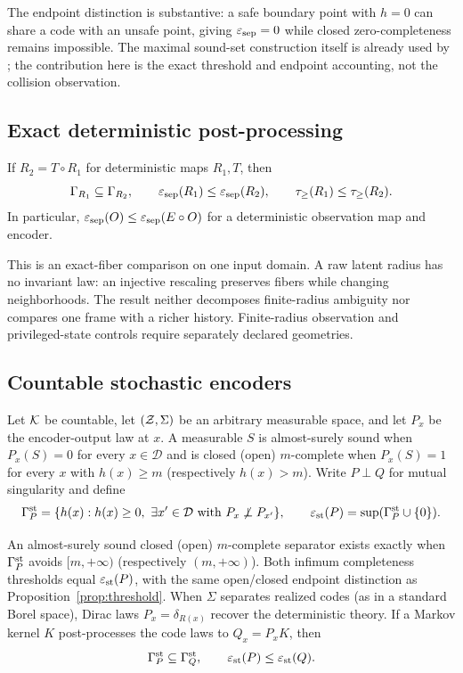 The endpoint distinction is substantive: a safe boundary point with $h=0$ can share a code with an
unsafe point, giving $\varepsilon_{\mathrm{sep}}=0$ while closed zero-completeness remains impossible.  The maximal
sound-set construction itself is already used by \citet{lutkus2025latent}; the contribution here is
the exact threshold and endpoint accounting, not the collision observation.

\subsection{Exact deterministic post-processing}

\begin{theorem}\label{thm:data-processing}
If $R_2=T\circ R_1$ for deterministic maps $R_1,T$, then
\[
 \Gamma_{R_1}\subseteq\Gamma_{R_2},\qquad
 \varepsilon_{\mathrm{sep}}(R_1)\leq\varepsilon_{\mathrm{sep}}(R_2),\qquad
 \tau_{\geq}(R_1)\leq\tau_{\geq}(R_2).
\]
In particular, $\varepsilon_{\mathrm{sep}}(O)\leq\varepsilon_{\mathrm{sep}}(E\circ O)$ for a deterministic observation map and encoder.
\end{theorem}

This is an exact-fiber comparison on one input domain.  A raw latent radius has no invariant law:
an injective rescaling preserves fibers while changing neighborhoods.  The result neither
decomposes finite-radius ambiguity nor compares one frame with a richer history.  Finite-radius
observation and privileged-state controls require separately declared geometries.

\subsection{Countable stochastic encoders}

Let $\mathcal{K}$ be countable, let $(\mathcal{Z},\Sigma)$ be an arbitrary measurable space, and let $P_x$ be the
encoder-output law at $x$.  A measurable $S$ is almost-surely sound when $P_x(S)=0$ for every
$x\in\mathcal D$ and is closed (open) $m$-complete when $P_x(S)=1$ for every $x$ with
$h(x)\geq m$ (respectively $h(x)>m$).  Write $P\perp Q$ for mutual singularity and define
\[
 \Gamma_P^{\rm st}=\{h(x):h(x)\geq0,\ \exists x'\in\mathcal D
 \text{ with }P_x\not\perp P_{x'}\},\qquad
 \varepsilon_{\rm st}(P)=\sup(\Gamma_P^{\rm st}\cup\{0\}).
\]

\begin{theorem}\label{thm:stochastic-separation}
An almost-surely sound closed (open) $m$-complete separator exists exactly when
$\Gamma_P^{\rm st}$ avoids $[m,+\infty)$ (respectively $(m,+\infty)$).  Both infimum completeness
thresholds equal $\varepsilon_{\rm st}(P)$, with the same open/closed endpoint distinction as
Proposition~\ref{prop:threshold}.  When $\Sigma$ separates realized codes (as in a standard Borel
space), Dirac laws $P_x=\delta_{R(x)}$ recover the deterministic theory.
If a Markov kernel $K$ post-processes the code laws to $Q_x=P_xK$, then
\[
 \Gamma_P^{\rm st}\subseteq\Gamma_Q^{\rm st},\qquad
 \varepsilon_{\rm st}(P)\leq\varepsilon_{\rm st}(Q).
\]
\end{theorem}

